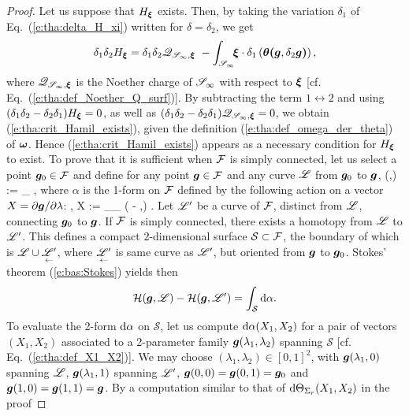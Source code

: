 \begin{proof}
Let us suppose that $H_{\bm{\xi}}$ exists. Then, by taking the variation $\delta_1$
of Eq.~(\ref{e:tha:delta_H_xi}) written for $\delta = \delta_2$, we get
\[
    \delta_1 \delta_2 H_{\bm{\xi}} = \delta_1 \delta_2 \mathscr{Q}_{\mathscr{S}_\infty,\bm{\xi}}
    \ -  \int_{\mathscr{S}_\infty} \!\! \bm{\xi}\cdot\delta_1\left(\bm{\theta}\textbf{(}\bm{g},\delta_2\bm{g}\textbf{)}\right)  ,
\]
where $\mathscr{Q}_{\mathscr{S}_\infty,\bm{\xi}}$ is the
Noether charge of $\mathscr{S}_\infty$ with respect to $\bm{\xi}$
[cf. Eq.~(\ref{e:tha:def_Noether_Q_surf})].
By subtracting the term $1\leftrightarrow 2$ and using
$(\delta_1 \delta_2 - \delta_2 \delta_1) H_{\bm{\xi}} = 0$, as well
as $(\delta_1 \delta_2 - \delta_2 \delta_1) \mathscr{Q}_{\mathscr{S}_\infty,\bm{\xi}} = 0$,
we obtain (\ref{e:tha:crit_Hamil_exists}), given the definition (\ref{e:tha:def_omega_der_theta})
of $\bm{\omega}$. Hence (\ref{e:tha:crit_Hamil_exists}) appears as a necessary
condition for $H_{\bm{\xi}}$ to exist.
To prove that it is sufficient when $\mathcal{F}$ is simply connected, let us select
a point $\bm{g}_0\in\mathcal{F}$ and define for any point $\bm{g}\in\mathcal{F}$ and any
curve $\mathscr{L}$ from $\bm{g}_0$ to $\bm{g}$,
\be  \label{e:tha:def_H_g_Li}
    (,\Li) := \int_{\Li} \alpha ,
\ee
where $\alpha$ is the 1-form on $\mathcal{F}$ defined by the following action on
a vector $X = {\partial \bm{g}}/{\partial \lambda}$:
\be  \label{e:tha:def_alpha_X}
    \langle\alpha, X \rangle :=
    \int_{\Sp_\infty}\!\! \left(  \der{}{\lambda} \lld\w{\xi}\rld
    - \w{\xi}\cdot\w{\theta}\Lld{},\Rld \right) .
\ee
Let $\mathscr{L}'$ be a curve of $\mathcal{F}$, distinct from $\mathscr{L}$, connecting $\bm{g}_0$ to $\bm{g}$.
If $\mathcal{F}$ is simply connected, there exists a homotopy from $\mathscr{L}$ to $\mathscr{L}'$.
This defines a compact 2-dimensional surface $\mathcal{S}\subset\mathcal{F}$, the boundary of which is
$\mathscr{L}\cup \underset{\leftarrow}{\mathscr{L}'}$, where $\underset{\leftarrow}{\mathscr{L}'}$ is
same curve as $\mathscr{L}'$, but oriented from $\bm{g}$ to $\bm{g}_0$.
Stokes' theorem (\ref{e:bas:Stokes}) yields then
\[
    \mathcal{H}(\bm{g},\mathscr{L}) - \mathcal{H}(\bm{g},\mathscr{L}') = \int_{\mathcal{S}} \mathrm{d} \alpha .
\]
To evaluate the 2-form $\mathrm{d} \alpha$ on $\mathcal{S}$, let us compute
$\mathrm{d} \alpha(X_1,X_2)$ for a pair of vectors $(X_1,X_2)$ associated to a
2-parameter family $\bm{g}(\lambda_1,\lambda_2)$ spanning $\mathcal{S}$
[cf. Eq.~(\ref{e:tha:def_X1_X2})]. We may choose $(\lambda_1,\lambda_2)\in[0,1]^2$,
with $\bm{g}(\lambda_1,0)$ spanning $\mathscr{L}$, $\bm{g}(\lambda_1,1)$ spanning $\mathscr{L}'$,
$\bm{g}(0,0) = \bm{g}(0,1) = \bm{g}_0$ and $\bm{g}(1,0) = \bm{g}(1,1) = \bm{g}$.
By a computation similar to that of $\mathrm{d} \Theta_{\Sigma_r} (X_1,X_2)$ in the proof

\end{proof}
